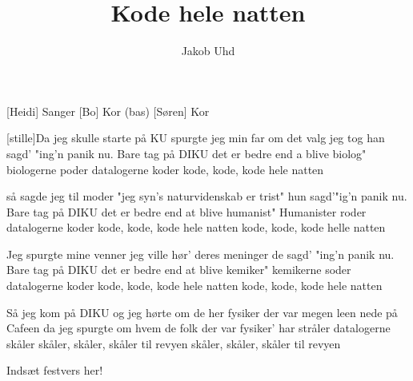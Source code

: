 \documentclass[a4paper]{article}
\title{Kode hele natten}
\author{Jakob Uhd}
\begin{document}
\maketitle

\begin{roles}
  [Heidi] Sanger
  [Bo] Kor (bas)
  [Søren] Kor
\end{roles}

\begin{song}

[stille]Da jeg skulle starte på KU
spurgte jeg min far om det valg jeg tog
han sagd' "ing'n panik nu. Bare tag på DIKU
det er bedre end a blive biolog"
biologerne poder
datalogerne koder
kode, kode, kode hele natten


så sagde jeg til moder
"jeg syn's naturvidenskab er trist"
hun sagd'"ig'n panik nu. Bare tag på DIKU
det er bedre end at blive humanist"
Humanister roder
datalogerne koder
kode, kode, kode hele natten
kode, kode, kode helle natten


Jeg spurgte mine venner
jeg ville hør' deres meninger
de sagd' "ing'n panik nu. Bare tag på DIKU
det er bedre end at blive kemiker"
kemikerne soder
datalogerne koder
kode, kode, kode hele natten
kode, kode, kode hele natten

Så jeg kom på DIKU
og jeg hørte om de her fysiker
der var megen leen nede på Cafeen
da jeg spurgte om hvem de folk der var
fysiker' har stråler
datalogerne skåler
skåler, skåler, skåler til revyen
skåler, skåler, skåler til revyen

\scene Indsæt festvers her!

\end{song}
\end{document}
